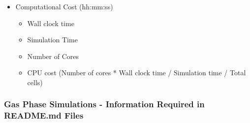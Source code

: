 \documentclass[12pt]{article}
\begin{document}
\begin{itemize}[noitemsep]
\begin{itemize}[noitemsep]
\begin{itemize}[noitemsep]
			\end{itemize} 
 	 	\end{itemize} 
 \item Computational Cost (hh:mm:ss)
 	\begin{itemize}[noitemsep]
 	\item Wall clock time
 	\item Simulation Time
 	\item Number of Cores
 	\item CPU cost (Number of cores * Wall clock time / Simulation time / Total cells)
 	\end{itemize}
\end{itemize}

\newpage
\subsubsection{Gas Phase Simulations - Information Required in README.md Files}
\end{document}
